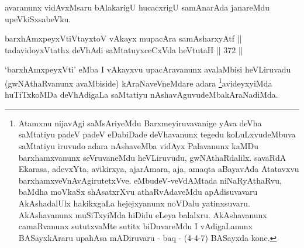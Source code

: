 \begin{artha}
avaranunx vidAvxMsaru bAlakarigU hucacxrigU samAnarAda janareMdu
upeVkiSxsabeVku.
\end{artha}



\begin{shl}
barxhAmxpeyxVtiVtayxtoV vAkayx mupacAra samAsharxyAtf || \\
tadavidoyxVtathx deVhAdi saMtatuyxceCxVda heVtutaH \hfill || 372 ||
\end{shl}

\begin{artha}
`barxhAmxpeyxVti' eMba I vAkayxvu upacAravanunx avalaMbisi heVLiruvadu
(gwNAthaRvanunx avaMbiside) kAraNaveVneMdare adara \footnote{Atamxnu nijavAgi saMsAriyeMdu Barxmeyiruvavanige yAva
deVha saMtatiyu padeV padeV eDabiDade deVhavanunx tegedu
koLuLxvudeMbuva saMtatiyu iruvudo adara nAshaveMba vidAyx
Palavanunx kaMDu barxhamxvanunx seVruvaneMdu heVLiruvudu,
gwNAthaRdalilx. savaRdA Ekarasa, adevxYta, avikirxya, ajarAmara,
aja, amaqta aBayavAda Atatavxvu
barxhamxveVnAvAgirutetxVve. eMbudeV-veVdAMtada niNaRyAthaRvu,
baMdha moVkaSx shAsatxrXvu athaRvAdaveMdu apAdisuvavaru
AkAshadalUlx hakikxgaLa hejejxyanunx noVDalu
yatinxsuvaru. AkAshavanunx muSiTxyiMda hiDidu eLeya balalxru.
AkAshavanunx camaRvanunx sututxvaMte sutitx biDuvareMdu I
vAdigaLanunx BASayxkAraru upahAsa mADiruvaru - baq - (4-4-7)
BASayxda kone.}avideyxyiMda huTiTxkoMDa deVhAdigaLa saMtatiyu
nAshavAguvudeMbakAraNadiMda.
\end{artha}
